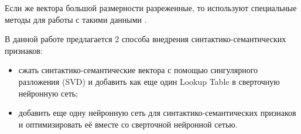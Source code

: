     Если же вектора большой размерности разреженные, то используют специальные методы для
    работы с такими данными \citep{davissurvey}.

    В данной работе предлагается 2 способа внедрения синтактико-семантических признаков:
    \begin{itemize}
      \item сжать синтактико-семантические вектора с помощью сингулярного разложения (SVD) и добавить
      как еще один Lookup Table в сверточную нейронную сеть;
      \item добавить еще одну нейронную сеть для синтактико-семантических признаков и оптимизировать
      её вместе со сверточной нейронной сетью.
    \end{itemize}
